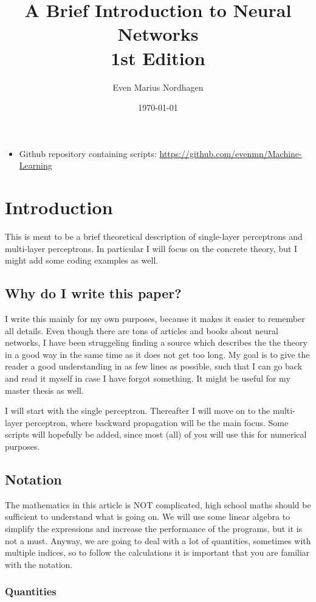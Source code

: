 \documentclass[norsk,a4paper,12pt]{article}
\title{A Brief Introduction to Neural Networks\\\vspace{2mm} \Large{1st Edition}}
\author{\large Even Marius Nordhagen}
\date\today
\begin{document}
\maketitle

\begin{itemize}
\item Github repository containing scripts: \url{https://github.com/evenmn/Machine-Learning}
\end{itemize}


\section{Introduction}
This is ment to be a brief theoretical description of single-layer perceptrons and multi-layer perceptrons. In particular I will focus on the concrete theory, but I might add some coding examples as well. 

\subsection{Why do I write this paper?} 
I write this mainly for my own purposes, because it makes it easier to remember all details. Even though there are tons of articles and books about neural networks, I have been struggeling finding a source which describes the the theory in a good way in the same time as it does not get too long. My goal is to give the reader a good understanding in as few lines as possible, such that I can go back and read it myself in case I have forgot something. It might be useful for my master thesis as well. 

I will start with the single perceptron. Thereafter I will move on to the multi-layer perceptron, where backward propagation will be the main focus. Some scripts will hopefully be added, since most (all) of you will use this for numerical purposes.

\subsection{Notation}
The mathematics in this article is NOT complicated, high school maths should be sufficient to understand what is going on. We will use some linear algebra to simplify the expressions and increase the performance of the programs, but it is not a must. Anyway, we are going to deal with a lot of quantities, sometimes with multiple indices, so to follow the calculations it is important that you are familiar with the notation. 
\subsubsection{Quantities}
\end{document}
